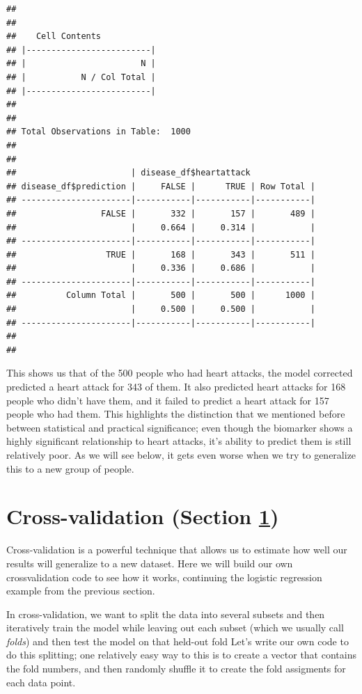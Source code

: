 \documentclass[
  12pt,
]{book}
\begin{document}
\begin{verbatim}
## 
##  
##    Cell Contents
## |-------------------------|
## |                       N |
## |           N / Col Total |
## |-------------------------|
## 
##  
## Total Observations in Table:  1000 
## 
##  
##                       | disease_df$heartattack 
## disease_df$prediction |     FALSE |      TRUE | Row Total | 
## ----------------------|-----------|-----------|-----------|
##                 FALSE |       332 |       157 |       489 | 
##                       |     0.664 |     0.314 |           | 
## ----------------------|-----------|-----------|-----------|
##                  TRUE |       168 |       343 |       511 | 
##                       |     0.336 |     0.686 |           | 
## ----------------------|-----------|-----------|-----------|
##          Column Total |       500 |       500 |      1000 | 
##                       |     0.500 |     0.500 |           | 
## ----------------------|-----------|-----------|-----------|
## 
## 
\end{verbatim}

This shows us that of the 500 people who had heart attacks, the model corrected predicted a heart attack for 343 of them. It also predicted heart attacks for 168 people who didn't have them, and it failed to predict a heart attack for 157 people who had them. This highlights the distinction that we mentioned before between statistical and practical significance; even though the biomarker shows a highly significant relationship to heart attacks, it's ability to predict them is still relatively poor. As we will see below, it gets even worse when we try to generalize this to a new group of people.

\hypertarget{cross-validation}{%
\section{Cross-validation (Section \ref{cross-validation})}\label{cross-validation}}

Cross-validation is a powerful technique that allows us to estimate how well our results will generalize to a new dataset. Here we will build our own crossvalidation code to see how it works, continuing the logistic regression example from the previous section.

In cross-validation, we want to split the data into several subsets and then iteratively train the model while leaving out each subset (which we usually call \emph{folds}) and then test the model on that held-out fold Let's write our own code to do this splitting; one relatively easy way to this is to create a vector that contains the fold numbers, and then randomly shuffle it to create the fold assigments for each data point.
\end{document}
